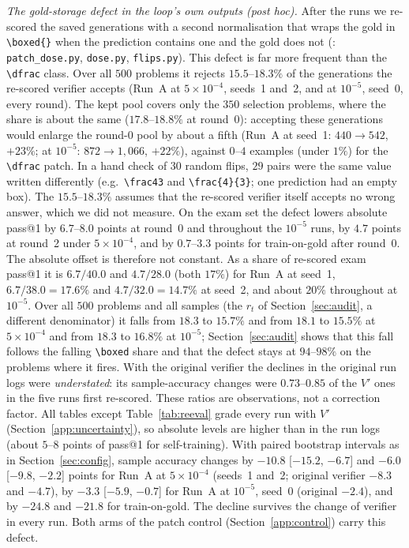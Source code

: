 \documentclass[runningheads]{llncs}
\begin{document}
\emph{The gold-storage defect in the loop's own outputs (post hoc).} After the runs we
re-scored the saved generations with a second normalisation that wraps the gold
in \verb|\boxed{}| when the prediction contains one and the gold does not
(: \texttt{patch\_dose.py},
\texttt{dose.py}, \texttt{flips.py}). This defect is far more frequent than the \verb|\dfrac|
class. Over all $500$ problems it rejects $15.5$--$18.3\%$ of the generations
the re-scored verifier accepts (Run~A at $5\times10^{-4}$, seeds~1 and~2, and
at $10^{-5}$, seed~0, every round). The kept pool covers only the $350$
selection problems, where the share is about the same ($17.8$--$18.8\%$ at round~0): accepting these
generations would enlarge the round-0 pool by about a fifth (Run~A at seed~1:
$440\to542$, $+23\%$; at $10^{-5}$: $872\to1{,}066$, $+22\%$), against $0$--$4$
examples (under $1\%$) for the \verb|\dfrac| patch. In a hand
check of $30$ random flips, $29$ pairs were the same value written differently
(e.g.\ \verb|\frac43| and \verb|\frac{4}{3}|; one prediction had an empty box).
The $15.5$--$18.3\%$ assumes that the re-scored verifier itself accepts no wrong
answer, which we did not measure. On the exam set the defect lowers absolute
pass@1 by $6.7$--$8.0$ points at round~0 and throughout the $10^{-5}$ runs, by
$4.7$ points at round~2 under $5\times10^{-4}$, and by $0.7$--$3.3$ points for
train-on-gold after round~0. The absolute offset is therefore not constant. As
a share of re-scored exam pass@1 it is $6.7/40.0$ and $4.7/28.0$ (both $17\%$)
for Run~A at seed~1, $6.7/38.0=17.6\%$ and $4.7/32.0=14.7\%$ at seed~2, and
about $20\%$ throughout at $10^{-5}$. Over all $500$ problems and all samples
(the $r_t$ of Section~\ref{sec:audit}, a different denominator) it falls from
$18.3$ to $15.7\%$ and from $18.1$ to $15.5\%$ at $5\times10^{-4}$ and from
$18.3$ to $16.8\%$ at $10^{-5}$; Section~\ref{sec:audit} shows that this fall
follows the falling \verb|\boxed| share and that the defect stays at
$94$--$98\%$ on the problems where it fires. With the original verifier the declines in the original run logs were \emph{understated}: its sample-accuracy changes were $0.73$--$0.85$ of the $V'$ ones in the five runs first re-scored. These ratios are observations, not a correction factor. All tables except Table~\ref{tab:reeval} grade every run with $V'$ (Section~\ref{app:uncertainty}), so absolute levels are higher than in the run logs (about $5$--$8$ points of pass@1 for self-training). With paired bootstrap intervals as in Section~\ref{sec:config}, sample accuracy changes by $-10.8$ [$-15.2$, $-6.7$] and $-6.0$ [$-9.8$, $-2.2$] points for Run~A at $5\times10^{-4}$ (seeds~1 and~2; original verifier $-8.3$ and $-4.7$), by $-3.3$ [$-5.9$, $-0.7$] for Run~A at $10^{-5}$, seed~0 (original $-2.4$), and by $-24.8$ and $-21.8$ for train-on-gold. The decline survives the change of verifier in every run. Both arms of the patch control
(Section~\ref{app:control}) carry this defect.
\end{document}

